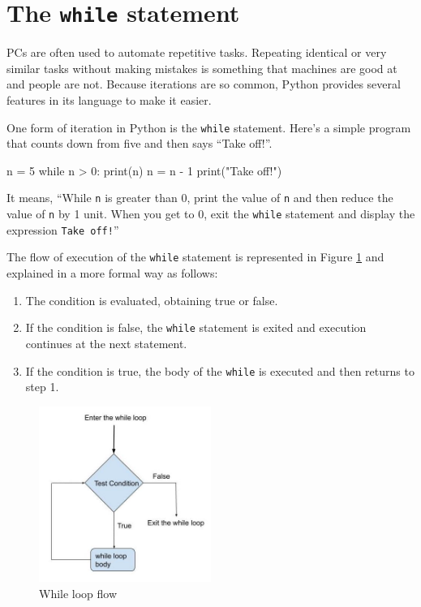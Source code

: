 \hypertarget{la-instrucción-while}{%
\section{\texorpdfstring{The \texttt{while} statement}{La instrucción while}}\label{la-instrucción-while}}

  
 

PCs are often used to automate repetitive tasks. Repeating identical or very similar tasks without making mistakes is something that machines are good at and people are not. Because iterations are so common, Python provides several features in its language to make it easier.

One form of iteration in Python is the \texttt{while} statement. Here's a simple program that counts down from five and then says ``Take off!''.

\begin{python}[frame=single]
n = 5
while n > 0:
    print(n)
    n = n - 1
print("Take off!")
\end{python}

It means, ``While \texttt{n} is greater than 0, print the value of \texttt{n} and then reduce the value of \texttt{n} by 1 unit. When you get to 0, exit the \texttt{while} statement and display the expression \texttt{Take off!}''



The flow of execution of the \texttt{while} statement is represented in Figure \ref{fig:while} and explained in a more formal way as follows:

\begin{enumerate}
\def\labelenumi{\arabic{enumi}.}
\item
  The condition is evaluated, obtaining true or false.
\item
  If the condition is false, the \texttt{while} statement is exited and execution continues at the next statement.
\item
  If the condition is true, the body of the \texttt{while} is executed and then returns to step 1.
\end{enumerate}

\begin{figure}[H]
    \centering
    \includegraphics[width=0.50\textwidth]{images/while-eng.jpg}
    \caption{While loop flow}
    \label{fig:while}
\end{figure}

